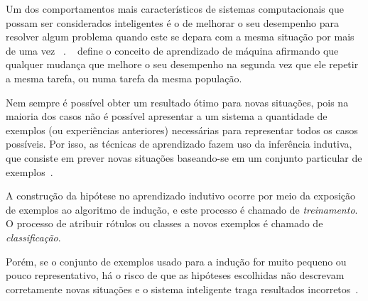 % 
%

\newcommand{\vect}[1]{\mathbf{#1}}
\newcommand{\norma}[1]{\lVert #1 \rVert}

%
%
%

Um dos comportamentos mais característicos de sistemas computacionais que possam ser considerados inteligentes é o de melhorar o seu desempenho para resolver algum problema quando este se depara com a mesma situação por mais de uma vez ~\cite{luger2004inteligencia}. ~ define o conceito de aprendizado de máquina afirmando que qualquer mudança que melhore o seu desempenho na segunda vez que ele repetir a mesma tarefa, ou numa tarefa da mesma população.

Nem sempre é possível obter um resultado ótimo para novas situações, pois na maioria dos casos não é possível apresentar a um sistema a quantidade de exemplos (ou experiências anteriores) necessárias para representar todos os casos possíveis. Por isso, as técnicas de aprendizado fazem uso da inferência indutiva, que consiste em prever novas situações baseando-se em um conjunto particular de exemplos~\cite{luger2004inteligencia}.

A construção da hipótese no aprendizado indutivo ocorre por meio da exposição de exemplos ao algoritmo de indução, e este processo é chamado de \emph{treinamento}. O processo de atribuir rótulos ou classes a novos exemplos é chamado de \emph{classificação}.

Porém, se o conjunto de exemplos usado para a indução for muito pequeno ou pouco representativo, há o risco de que as hipóteses escolhidas não descrevam corretamente novas situações e o sistema inteligente traga resultados incorretos~\cite[p. 90]{rezende2003sistemas}.

